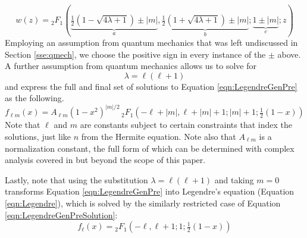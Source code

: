\documentclass[titlepage]{article}
\numberwithin{equation}{section}
\begin{document}
\begin{equation*}
    w(z) = {}_2F_1(\underbrace{\tfrac{1}{2}(1-\sqrt{4\lambda+1})\pm|m|}_a,\underbrace{\tfrac{1}{2}(1+\sqrt{4\lambda+1})\pm|m|}_b;\underbrace{1\pm|m|}_c;z)
\end{equation*}
Employing an assumption from quantum mechanics that was left undiscussed in Section \ref{sse:qmech}, we choose the positive sign in every instance of the $\pm$ above. A further assumption from quantum mechanics allows us to solve for
\begin{equation*}
    \lambda = \ell(\ell+1)\tag{$\ell=0,1,2,\dots$}
\end{equation*}
and express the full and final set of solutions to Equation \ref{eqn:LegendreGenPre} as the following.
\begin{equation}\label{eqn:LegendreGenPreSolution}
    f_{\ell m}(x) = A_{\ell m}(1-x^2)^{|m|/2}\,{}_2F_1(-\ell+|m|,\ell+|m|+1;|m|+1;\tfrac{1}{2}(1-x))
\end{equation}
Note that $\ell$ and $m$ are constants subject to certain constraints that index the solutions, just like $n$ from the Hermite equation. Note also that $A_{\ell m}$ is a normalization constant, the full form of which can be determined with complex analysis covered in \textcite{bib:Seaborn} but beyond the scope of this paper.\par
Lastly, note that using the substitution $\lambda=\ell(\ell+1)$ and taking $m=0$ transforms Equation \ref{eqn:LegendreGenPre} into Legendre's equation (Equation \ref{eqn:Legendre}), which is solved by the similarly restricted case of Equation \ref{eqn:LegendreGenPreSolution}:
\begin{equation}\label{eqn:LegendreSolution}
    f_\ell(x) = {}_2F_1(-\ell,\ell+1;1;\tfrac{1}{2}(1-x))
\end{equation}
\newpage
\end{document}
